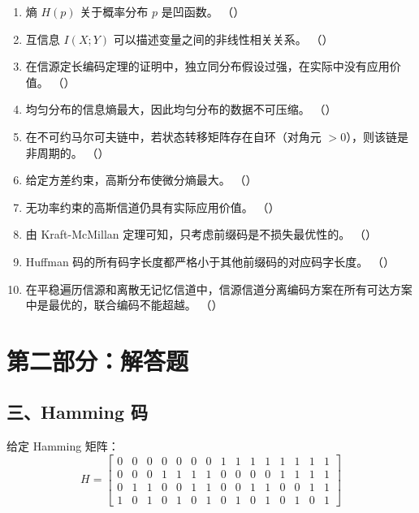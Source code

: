 \documentclass[12pt,a4paper]{ctexart}
\begin{document}
\begin{enumerate}[label=\arabic*., leftmargin=*]

\item 熵 $H(p)$ 关于概率分布 $p$ 是凹函数。 \hfill（\quad）

\item 互信息 $I(X;Y)$ 可以描述变量之间的非线性相关关系。 \hfill（\quad）

\item 在信源定长编码定理的证明中，独立同分布假设过强，在实际中没有应用价值。 \hfill（\quad）

\item 均匀分布的信息熵最大，因此均匀分布的数据不可压缩。 \hfill（\quad）

\item 在不可约马尔可夫链中，若状态转移矩阵存在自环（对角元 $>0$），则该链是非周期的。 \hfill（\quad）

\item 给定方差约束，高斯分布使微分熵最大。 \hfill（\quad）

\item 无功率约束的高斯信道仍具有实际应用价值。 \hfill（\quad）

\item 由 Kraft-McMillan 定理可知，只考虑前缀码是不损失最优性的。 \hfill（\quad）

\item Huffman 码的所有码字长度都严格小于其他前缀码的对应码字长度。 \hfill（\quad）

\item 在平稳遍历信源和离散无记忆信道中，信源信道分离编码方案在所有可达方案中是最优的，联合编码不能超越。 \hfill（\quad）

\end{enumerate}

\section*{第二部分：解答题}

\subsection*{三、Hamming 码}

给定 Hamming 矩阵：
\setcounter{MaxMatrixCols}{15}
{\small
\[
H = \begin{bmatrix}
0&0&0&0&0&0&0&1&1&1&1&1&1&1&1\\
0&0&0&1&1&1&1&0&0&0&0&1&1&1&1\\
0&1&1&0&0&1&1&0&0&1&1&0&0&1&1\\
1&0&1&0&1&0&1&0&1&0&1&0&1&0&1
\end{bmatrix}
\]
}
\end{document}
